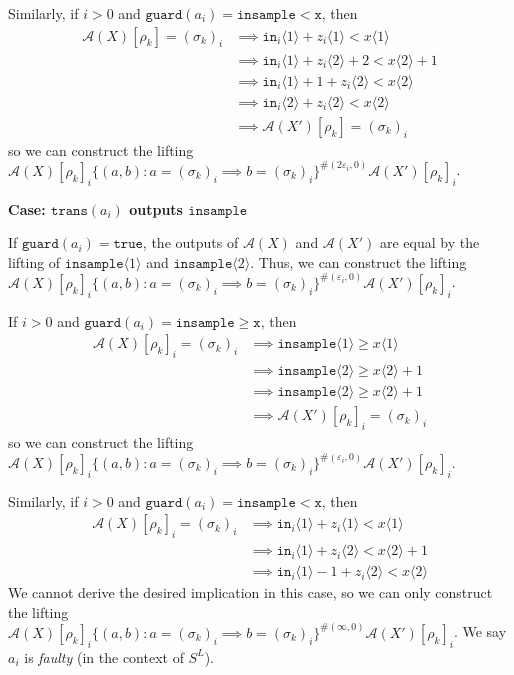 \documentclass[12pt]{article}
\newcommand{\gguard}[1][x]{\texttt{insample}\geq \texttt{#1}}
\newcommand{\lguard}[1][x]{\texttt{insample} < \texttt{#1}}
\newcommand{\brangle}[1]{\langle #1 \rangle}
\newcommand{\guard}{\texttt{guard}}
\newcommand{\trans}{\texttt{trans}}
\theoremstyle{definition}
\begin{document}
Similarly, if $i>0$ and $\guard(a_i) = \lguard$, then \begin{align*}
	\mathcal{A}(X)[\rho_k] = (\sigma_k)_i&\implies \texttt{in}_i\langle 1 \rangle + z_i\langle 1 \rangle < x\langle 1 \rangle\\
	&\implies \texttt{in}_i\langle 1\rangle + z_i\langle 2 \rangle +2 < x\langle 2 \rangle+1\\
	&\implies\texttt{in}_i\langle 1 \rangle +1 + z_i\langle 2 \rangle < x\langle 2 \rangle\\
	&\implies\texttt{in}_i\langle 2 \rangle + z_i\langle 2 \rangle < x\langle 2 \rangle\\
	&\implies \mathcal{A}(X')[\rho_k] = (\sigma_k)_i
\end{align*}
so we can construct the lifting $\mathcal{A}(X)[\rho_k]_i\{(a, b): a = (\sigma_k)_i \implies b = (\sigma_k)_i\}^{\#(2\varepsilon_i, 0)}\mathcal{A}(X')[\rho_k]_i$.

\textbf{Case: $\trans(a_i)$ outputs $\texttt{insample}$}

If $\guard(a_i) = \texttt{true}$, the outputs of $\mathcal{A}(X)$ and $\mathcal{A}(X')$ are equal by the lifting of $\texttt{insample}\brangle{1}$ and $\texttt{insample}\brangle{2}$. Thus, we can construct the lifting  $\mathcal{A}(X)[\rho_k]_i\{(a, b): a = (\sigma_k)_i \implies b = (\sigma_k)_i\}^{\#(\varepsilon_i, 0)}\mathcal{A}(X')[\rho_k]_i$.

If $i > 0$ and $\guard(a_i) = \gguard$, then \begin{align*}
	\mathcal{A}(X)[\rho_k]_i = (\sigma_k)_i&\implies \texttt{insample}\brangle{1} \geq x\brangle{1}\\
	&\implies \texttt{insample}\brangle{2} \geq x\brangle{2}+1\\
	&\implies \texttt{insample}\brangle{2} \geq x\brangle{2} +1\\
	&\implies \mathcal{A}(X')[\rho_k]_i = (\sigma_k)_i
\end{align*}
so we can construct the lifting $\mathcal{A}(X)[\rho_k]_i\{(a, b): a = (\sigma_k)_i \implies b = (\sigma_k)_i\}^{\#(\varepsilon_i, 0)}\mathcal{A}(X')[\rho_k]_i$.

Similarly, if $i>0$ and $\guard(a_i) = \lguard$, then \begin{align*}
	\mathcal{A}(X)[\rho_k]_i = (\sigma_k)_i&\implies \texttt{in}_i\brangle{1} + z_i\brangle{1} < x\brangle{1}\\
	&\implies \texttt{in}_i\brangle{1} + z_i\brangle{2}  < x\brangle{2}+1\\
	&\implies \texttt{in}_i\brangle{1} - 1 + z_i\brangle{2}  < x\brangle{2}
\end{align*}
We cannot derive the desired implication in this case, so we can only construct the lifting $\mathcal{A}(X)[\rho_k]_i\{(a, b): a = (\sigma_k)_i \implies b = (\sigma_k)_i\}^{\#(\infty, 0)}\mathcal{A}(X')[\rho_k]_i$. We say $a_i$ is \textit{faulty} (in the context of $S^L$).
\end{document}
